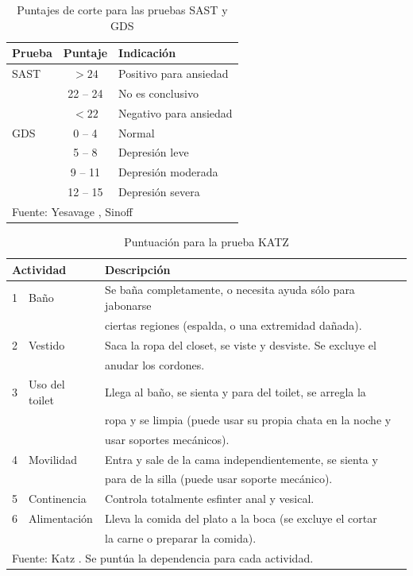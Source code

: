 \documentclass[12pt,letterpaper,draft]{book}
\begin{document}
\begin{table}
\centering
\caption{Puntajes de corte para las pruebas SAST y GDS}
\begin{tabular}{lcl}
\toprule
Prueba & Puntaje & Indicación \\
\midrule
SAST
& $>24$ & Positivo para ansiedad \\
& 22 -- 24 & No es conclusivo \\
& $<22$ & Negativo para ansiedad \\
\midrule
GDS
& 0 -- 4 & Normal \\
& 5 -- 8 & Depresión leve \\
& 9 -- 11 & Depresión moderada \\
& 12 -- 15 & Depresión severa \\
\bottomrule
\multicolumn{3}{l}{Fuente: Yesavage \cite{Yesavage82}, Sinoff \cite{sinoff99} }
\end{tabular}
\label{anexo:sast_gds}
\end{table}

\begin{table}
\centering
\caption{Puntuación para la prueba KATZ}
\begin{tabular}{lll}
\toprule
\multicolumn{2}{l}{Actividad} & Descripción \\
\midrule
1 & Baño           & Se baña completamente, o necesita ayuda sólo para jabonarse\\
                  && ciertas regiones (espalda, o una extremidad dañada). \\
2 & Vestido & Saca la ropa del closet, se viste y desviste. Se excluye el\\
                  && anudar los cordones. \\
3 & Uso del toilet & Llega al baño, se sienta y para del toilet, se arregla la\\
                  && ropa y se limpia (puede usar su propia chata en la noche y\\
                  && usar soportes mecánicos).\\
4 & Movilidad      & Entra y sale de la cama independientemente, se sienta y\\
                  && para de la silla (puede usar soporte mecánico). \\
5 & Continencia    & Controla totalmente esfinter anal y vesical.\\
6 & Alimentación   & Lleva la comida del plato a la boca (se excluye el cortar\\
                  && la carne o preparar la comida). \\
\bottomrule
\multicolumn{3}{l}{Fuente: Katz \cite{katz70}. Se puntúa la dependencia para cada actividad.}
\end{tabular}
\label{anexo:katz}
\end{table}
\end{document}
